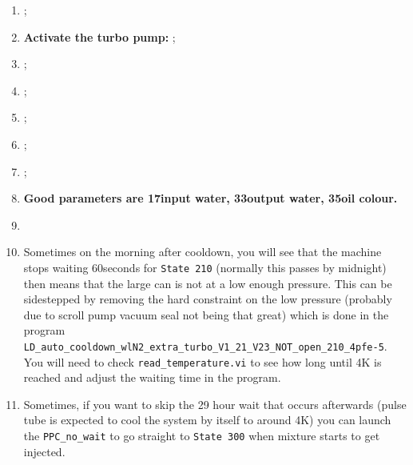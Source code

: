 \begin{enumerate}
  \begin{framed}\noindent
  \end{framed}

  \item {};
  \item \textbf{Activate the turbo pump:}  \ira
        ;
  \item {};
  \item {};
  \item {};
  \item {};
  \item {};
  \item \textbf{Good parameters are 17\ideg input water, 33\ideg output water,
        35\ideg oil colour.}
  \item {}
  \item Sometimes on the morning after cooldown, you will see that the machine
        stops waiting 60seconds for \texttt{State 210} (normally this passes by
        midnight) then means that the large can is not at a low enough pressure.
        This can be sidestepped by removing the hard constraint on the low
        pressure (probably due to scroll pump vacuum seal not being that great)
        which is done in the program
        \verb|LD_auto_cooldown_wlN2_extra_turbo_V1_21_V23_NOT_open_210_4pfe-5|.
        You will need to check \verb|read_temperature.vi| to see how long until
        4K is reached and adjust the waiting time in the program.
  \item Sometimes, if you want to skip the 29 hour wait that occurs afterwards
        (pulse tube is expected to cool the system by itself to around 4K) you
        can launch the \verb|PPC_no_wait| to go straight to \verb|State 300|
        when mixture starts to get injected.
\end{enumerate}

